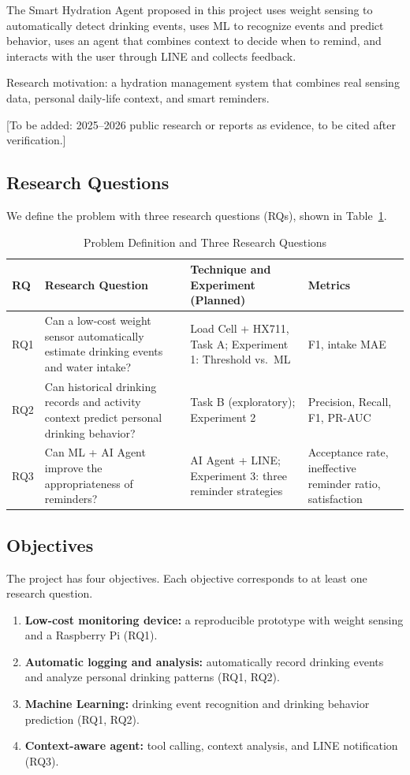 \documentclass[conference]{IEEEtran}
\begin{document}
The Smart Hydration Agent proposed in this project uses weight sensing to automatically detect drinking events, uses ML to recognize events and predict behavior, uses an agent that combines context to decide when to remind, and interacts with the user through LINE and collects feedback.

Research motivation: a hydration management system that combines real sensing data, personal daily-life context, and smart reminders.

[To be added: 2025--2026 public research or reports as evidence, to be cited after verification.]

\subsection{Research Questions}
We define the problem with three research questions (RQs), shown in Table~\ref{tab:rq}.

\begin{table}[htbp]
\caption{Problem Definition and Three Research Questions}
\label{tab:rq}
\centering
\footnotesize
\begin{tabular}{@{}p{}p{}p{}p{}@{}}
\toprule
\textbf{RQ} & \textbf{Research Question} & \textbf{Technique and Experiment (Planned)} & \textbf{Metrics} \\
\midrule
RQ1 & Can a low-cost weight sensor automatically estimate drinking events and water intake? & Load Cell + HX711, Task A; Experiment 1: Threshold vs.\ ML & F1, intake MAE \\
\midrule
RQ2 & Can historical drinking records and activity context predict personal drinking behavior? & Task B (exploratory); Experiment 2 & Precision, Recall, F1, PR-AUC \\
\midrule
RQ3 & Can ML + AI Agent improve the appropriateness of reminders? & AI Agent + LINE; Experiment 3: three reminder strategies & Acceptance rate, ineffective reminder ratio, satisfaction \\
\bottomrule
\end{tabular}
\end{table}

\subsection{Objectives}
The project has four objectives. Each objective corresponds to at least one research question.
\begin{enumerate}
\item \textbf{Low-cost monitoring device:} a reproducible prototype with weight sensing and a Raspberry Pi (RQ1).
\item \textbf{Automatic logging and analysis:} automatically record drinking events and analyze personal drinking patterns (RQ1, RQ2).
\item \textbf{Machine Learning:} drinking event recognition and drinking behavior prediction (RQ1, RQ2).
\item \textbf{Context-aware agent:} tool calling, context analysis, and LINE notification (RQ3).
\end{enumerate}
\end{document}
